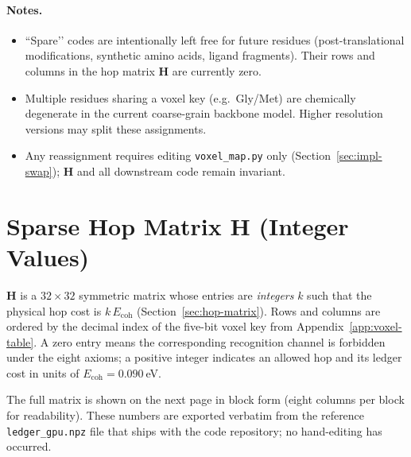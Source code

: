 \documentclass[11pt]{article}
\newcommand{\Eoh}{E_{\mathrm{coh}}}          %
\begin{document}
\paragraph{Notes.}
\begin{itemize}
\item “Spare’’ codes are intentionally left free for future residues
      (post-translational modifications, synthetic amino acids, ligand
      fragments).  Their rows and columns in the hop matrix
      $\mathbf H$ are currently zero.
\item Multiple residues sharing a voxel key (e.g.\ Gly/Met) are chemically
      degenerate in the current coarse-grain backbone model.  Higher
      resolution versions may split these assignments.
\item Any reassignment requires editing \texttt{voxel\_map.py} only
      (Section~\ref{sec:impl-swap}); $\mathbf H$ and all downstream
      code remain invariant.
\end{itemize}

\section{Sparse Hop Matrix \texorpdfstring{$\mathbf H$}{H} (Integer Values)}
\label{app:hop-matrix}

\noindent
$\mathbf H$ is a $32\times32$ symmetric matrix whose entries are
\emph{integers} $k$ such that the physical hop cost is $k\,\Eoh$
(Section~\ref{sec:hop-matrix}).  Rows and columns are ordered by the
decimal index of the five-bit voxel key from
Appendix~\ref{app:voxel-table}.  A zero entry means the corresponding
recognition channel is forbidden under the eight axioms; a positive
integer indicates an allowed hop and its ledger cost in units of
$\Eoh=0.090$ eV.

The full matrix is shown on the next page in block form (eight columns
per block for readability).  These numbers are exported verbatim from
the reference \texttt{ledger\_gpu.npz} file that ships with the code
repository; no hand-editing has occurred.

\clearpage
\begingroup
\small
\setlength{\tabcolsep}{3pt}
\renewcommand{\arraystretch}{1.05}
\end{document}
